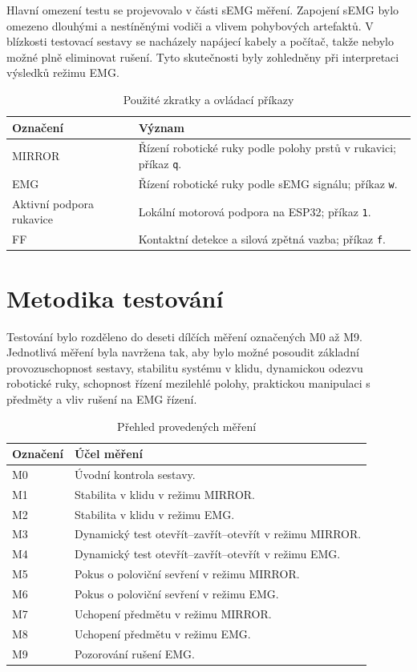 Hlavní omezení testu se projevovalo v části sEMG měření. Zapojení sEMG bylo omezeno dlouhými a nestíněnými vodiči a vlivem pohybových artefaktů. V blízkosti testovací sestavy se nacházely napájecí kabely a počítač, takže nebylo možné plně eliminovat rušení. Tyto skutečnosti byly zohledněny při interpretaci výsledků režimu EMG\@.

\begin{table}[htbp]
\centering
\caption{Použité zkratky a ovládací příkazy}
\label{tab:pouzite-zkratky-prikazy}
\begin{tabular}{|p{}|p{}|}
\hline
\textbf{Označení} & \textbf{Význam} \\
\hline
MIRROR & Řízení robotické ruky podle polohy prstů v rukavici; příkaz \texttt{q}. \\
\hline
EMG & Řízení robotické ruky podle sEMG signálu; příkaz \texttt{w}. \\
\hline
Aktivní podpora rukavice & Lokální motorová podpora na ESP32; příkaz \texttt{1}. \\
\hline
FF & Kontaktní detekce a silová zpětná vazba; příkaz \texttt{f}. \\
\hline
\end{tabular}
\end{table}

\section{Metodika testování}
\label{sec:metodika-testovani}

Testování bylo rozděleno do deseti dílčích měření označených M0 až M9. Jednotlivá měření byla navržena tak, aby bylo možné posoudit základní provozuschopnost sestavy, stabilitu systému v klidu, dynamickou odezvu robotické ruky, schopnost řízení mezilehlé polohy, praktickou manipulaci s předměty a vliv rušení na EMG řízení.

\begin{table}[htbp]
\centering
\caption{Přehled provedených měření}
\label{tab:prehled-mereni}
\begin{tabular}{|p{}|p{}|}
\hline
\textbf{Označení} & \textbf{Účel měření} \\
\hline
M0 & Úvodní kontrola sestavy. \\
\hline
M1 & Stabilita v klidu v režimu MIRROR\@. \\
\hline
M2 & Stabilita v klidu v režimu EMG\@. \\
\hline
M3 & Dynamický test otevřít--zavřít--otevřít v režimu MIRROR\@. \\
\hline
M4 & Dynamický test otevřít--zavřít--otevřít v režimu EMG\@. \\
\hline
M5 & Pokus o poloviční sevření v režimu MIRROR\@. \\
\hline
M6 & Pokus o poloviční sevření v režimu EMG\@. \\
\hline
M7 & Uchopení předmětu v režimu MIRROR\@. \\
\hline
M8 & Uchopení předmětu v režimu EMG\@. \\
\hline
M9 & Pozorování rušení EMG\@. \\
\hline
\end{tabular}
\end{table}

